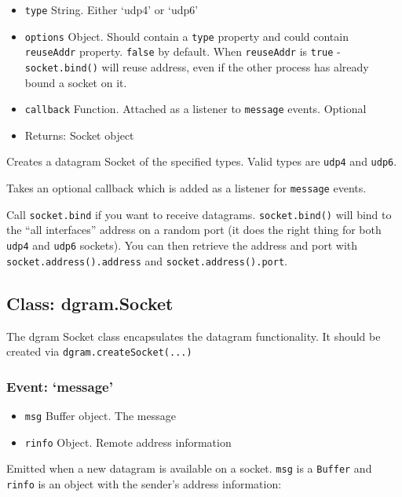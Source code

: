 \begin{itemize}
\itemsep1pt\parskip0pt
\item
  \texttt{type} String. Either `udp4' or `udp6'
\item
  \texttt{options} Object. Should contain a \texttt{type} property and
  could contain \texttt{reuseAddr} property. \texttt{false} by default.
  When \texttt{reuseAddr} is \texttt{true} - \texttt{socket.bind()} will
  reuse address, even if the other process has already bound a socket on
  it.
\item
  \texttt{callback} Function. Attached as a listener to \texttt{message}
  events. Optional
\item
  Returns: Socket object
\end{itemize}

Creates a datagram Socket of the specified types. Valid types are
\texttt{udp4} and \texttt{udp6}.

Takes an optional callback which is added as a listener for
\texttt{message} events.

Call \texttt{socket.bind} if you want to receive datagrams.
\texttt{socket.bind()} will bind to the ``all interfaces'' address on a
random port (it does the right thing for both \texttt{udp4} and
\texttt{udp6} sockets). You can then retrieve the address and port with
\texttt{socket.address().address} and \texttt{socket.address().port}.

\subsection{Class: dgram.Socket}\label{class-dgram.socket}

The dgram Socket class encapsulates the datagram functionality. It
should be created via \texttt{dgram.createSocket(...)}

\subsubsection{Event: `message'}\label{event-message}

\begin{itemize}
\itemsep1pt\parskip0pt
\item
  \texttt{msg} Buffer object. The message
\item
  \texttt{rinfo} Object. Remote address information
\end{itemize}

Emitted when a new datagram is available on a socket. \texttt{msg} is a
\texttt{Buffer} and \texttt{rinfo} is an object with the sender's
address information:

